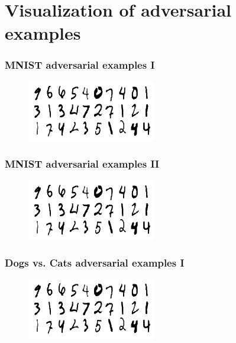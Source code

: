 \documentclass[handout]{beamer}
\begin{document}
\section{Visualization of adversarial examples}

\begin{frame}
\frametitle{MNIST adversarial examples I} 
\begin{figure}
\includegraphics[width=0.9\linewidth]{./pictures/MNIST.png}
\end{figure}
\end{frame}

\begin{frame}
\frametitle{MNIST adversarial examples II} 
\begin{figure}
\includegraphics[width=0.9\linewidth]{./pictures/MNIST.png}
\end{figure}
\end{frame}

\begin{frame}
\frametitle{Dogs vs. Cats adversarial examples I} 
\begin{figure}
\includegraphics[width=0.9\linewidth]{./pictures/MNIST.png}
\end{figure}
\end{frame}
\end{document}
